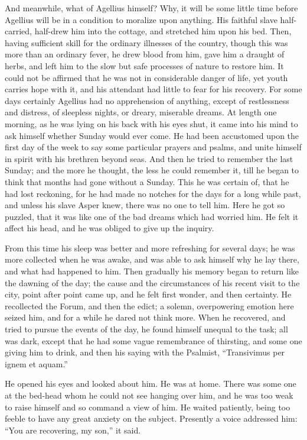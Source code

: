 And meanwhile, what of Agellius himself? Why, it will be some
little time before Agellius will be in a condition to moralize upon
anything. His faithful slave half-carried, half-drew him into the
cottage, and stretched him upon his bed. Then, having sufficient skill
for the ordinary illnesses of the country, though this was more
than an ordinary fever, he drew blood from him, gave him a draught of
herbs, and left him to the slow but safe processes of nature to
restore him. It could not be affirmed that he was not in considerable
danger of life, yet youth carries hope with it, and his attendant had
little to fear for his recovery. For some days certainly Agellius had
no apprehension of anything, except of restlessness and distress, of
sleepless nights, or dreary, miserable dreams. At length one morning,
as he was lying on his back with his eyes shut, it came into his mind
to ask himself whether Sunday would ever come. He had been accustomed
upon the first day of the week to say some particular prayers and
psalms, and unite himself in spirit with his brethren beyond seas. And
then he tried to remember the last Sunday; and the more he thought,
the less he could remember it, till he began to think that months had
gone without a Sunday. This he was certain of, that he had lost
reckoning, for he had made no notches for the days for a long while
past, and unless his slave Asper knew, there was no one to tell him.
Here he got so puzzled, that it was like one of the bad dreams which
had worried him. He felt it affect his head, and he was obliged to
give up the inquiry.

From this time his sleep was better and more refreshing for several
days; he was more collected when he was awake, and was able to ask
himself why he lay there, and what had happened to him. Then gradually
his memory began to return like the dawning of the day; the
cause and the circumstances of his recent visit to the city, point
after point came up, and he felt first wonder, and then certainty. He
recollected the Forum, and then the edict; a solemn, overpowering
emotion here seized him, and for a while he dared not think more. When
he recovered, and tried to pursue the events of the day, he found
himself unequal to the task; all was dark, except that he had some
vague remembrance of thirsting, and some one giving him to drink, and
then his saying with the Psalmist, ``Transivimus per ignem et
aquam.''

He opened his eyes and looked about him. He was at home. There was
some one at the bed-head whom he could not see hanging over him, and
he was too weak to raise himself and so command a view of him. He
waited patiently, being too feeble to have any great anxiety on the
subject. Presently a voice addressed him: ``You are recovering, my
son,'' it said.


